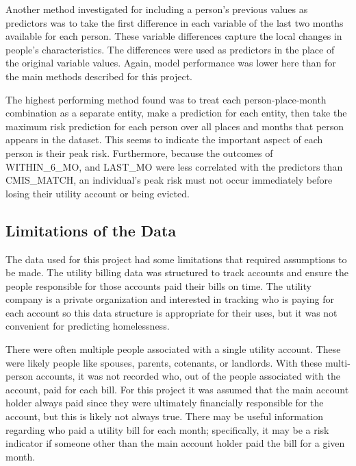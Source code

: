 \documentclass[utf8]{frontiersFPHY} %
\begin{document}
Another method investigated for including a person's previous values as predictors was to take the first difference in each variable of the last two months available for each person. These variable differences capture the local changes in people's characteristics. The differences were used as predictors in the place of the original variable values. Again, model performance was lower here than for the main methods described for this project.

The highest performing method found was to treat each person-place-month combination as a separate entity, make a prediction for each entity, then take the maximum risk prediction for each person over all places and months that person appears in the dataset. This seems to indicate the important aspect of each person is their peak risk. Furthermore, because the outcomes of WITHIN\_6\_MO, and LAST\_MO were less correlated with the predictors than CMIS\_MATCH, an individual's peak risk must not occur immediately before losing their utility account or being evicted. 

\subsection{Limitations of the Data}
The data used for this project had some limitations that required assumptions to be made. The utility billing data was structured to track accounts and ensure the people responsible for those accounts paid their bills on time. The utility company is a private organization and interested in tracking who is paying for each account so this data structure is appropriate for their uses, but it was not convenient for predicting homelessness.

There were often multiple people associated with a single utility account. These were likely people like spouses, parents, cotenants, or landlords. With these multi-person accounts, it was not recorded who, out of the people associated with the account, paid for each bill. For this project it was assumed that the main account holder always paid since they were ultimately financially responsible for the account, but this is likely not always true. There may be useful information regarding who paid a utility bill for each month; specifically, it may be a risk indicator if someone other than the main account holder paid the bill for a given month.
\end{document}
